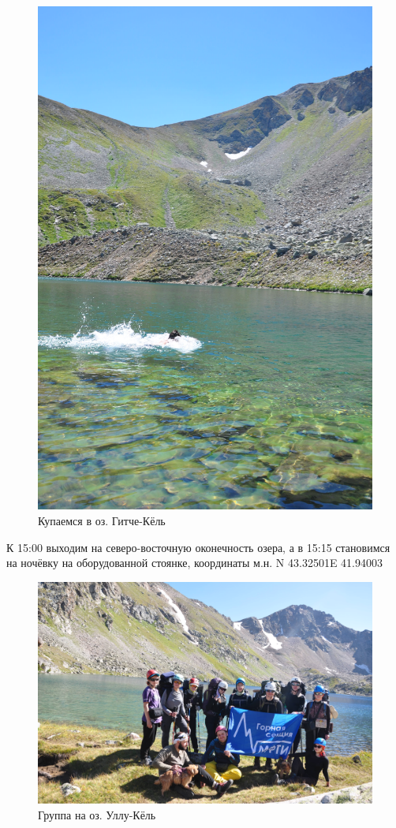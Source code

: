 \begin{figure}[h!]
	\centering
	\begin{turn}{90}
		\includegraphics[width=0.7\linewidth]{../pics/DSC_0774}
	\end{turn}
	\caption{Купаемся в оз. Гитче-Кёль}
	\label{fig:DSC_0774}
\end{figure}

К 15:00 выходим на северо-восточную оконечность озера, а в 15:15 становимся на ночёвку на оборудованной стоянке, координаты м.н. N 43.32501\degree E 41.94003\degree

\begin{figure}[h!]
	\centering
	\includegraphics[width=0.7\linewidth]{../pics/DSC_0800}
	\caption{Группа на оз. Уллу-Кёль}
	\label{fig:DSC_0800}
\end{figure}


